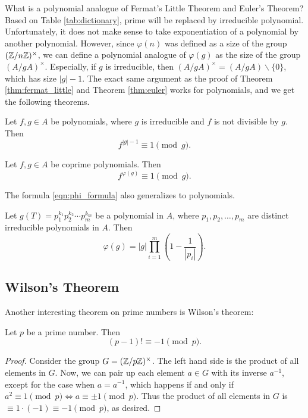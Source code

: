 What is a polynomial analogue of Fermat's Little Theorem and Euler's Theorem?
Based on Table \ref{tab:dictionary}, prime will be replaced by irreducible polynomial.
Unfortunately, it does not make sense to take exponentiation of a polynomial by another polynomial.
However, since $\varphi(n)$ was defined as a size of the group $(\mathbb{Z} / n\mathbb{Z})^\times$, we can define a polynomial analogue of $\varphi(g)$ as the size of the group $(A / gA)^\times$.
Especially, if $g$ is irreducible, then $(A / gA)^\times = (A / gA) \backslash \{0\}$, which has size $|g| - 1$.
The exact same argument as the proof of Theorem \ref{thm:fermat_little} and Theorem \ref{thm:euler} works for polynomials, and we get the following theorems.


\begin{theorem}
    \label{thm:polynomial_fermat_little}
    Let $f, g \in A$ be polynomials, where $g$ is irreducible and $f$ is not divisible by $g$.
    Then
    \[
        f^{|g| - 1} \equiv 1 \pmod{g}.
    \]
\end{theorem}


\begin{theorem}
    \label{thm:polynomial_euler}
    Let $f, g \in A$ be coprime polynomials.
    Then
    \[
        f^{\varphi(g)} \equiv 1 \pmod{g}.
    \]
\end{theorem}

The formula \eqref{eqn:phi_formula} also generalizes to polynomials.
\begin{theorem}
    \label{thm:polynomial_phi_prime_power}
    Let $g(T) = p_1^{k_1} p_2^{k_2} \cdots p_m^{k_m}$ be a polynomial in $A$, where $p_1, p_2, \ldots, p_m$ are distinct irreducible polynomials in $A$.
    Then
    \[
        \varphi(g) = |g| \prod_{i=1}^m \left(1 - \frac{1}{|p_i|}\right).
    \]
\end{theorem}

\subsection{Wilson's Theorem}
\label{subsec:basicnt_wilson}

Another interesting theorem on prime numbers is Wilson's theorem:
\begin{theorem}
    Let $p$ be a prime number. Then
    \[
        (p - 1)! \equiv -1 \pmod{p}.
    \]
\end{theorem}
\begin{proof}
    Consider the group $G = (\mathbb{Z} / p\mathbb{Z})^\times$.
    The left hand side is the product of all elements in $G$.
    Now, we can pair up each element $a \in G$ with its inverse $a^{-1}$, except for the case when $a = a^{-1}$, which happens if and only if $a^2 \equiv 1 \pmod{p} \Leftrightarrow a \equiv \pm 1 \pmod{p}$.
    Thus the product of all elements in $G$ is $\equiv 1 \cdot (-1) \equiv -1 \pmod{p}$, as desired.
\end{proof}

